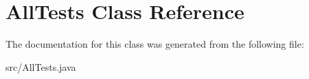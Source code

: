 \hypertarget{classAllTests}{}\section{All\+Tests Class Reference}
\label{classAllTests}


The documentation for this class was generated from the following file\+:\begin{DoxyCompactItemize}
\item 
src/All\+Tests.\+java\end{DoxyCompactItemize}
